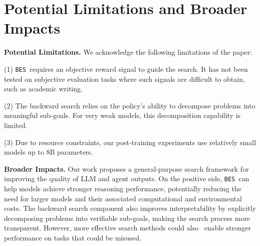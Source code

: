\documentclass{llmxive}
\providecommand{\ours}{\texttt{BES}}
\begin{document}
\section{Potential Limitations and Broader Impacts}

\label{app:lim}

\textbf{Potential Limitations.} We acknowledge the following limitations of the paper:

(1) \ours\ requires an objective reward signal to guide the search. It has not been tested on subjective evaluation tasks where such signals are difficult to obtain, such as academic writing.

(2) The backward search relies on the policy's ability to decompose problems into meaningful sub-goals. For very weak models, this decomposition capability is limited. 

(3) Due to resource constraints, our post-training experiments use relatively small models up to 8B parameters.

 

\textbf{Broader Impacts.} Our work proposes a general-purpose search framework for improving the quality of LLM and agent outputs. On the positive side, \ours\ can help models achieve stronger reasoning performance, potentially reducing the need for larger models and their associated computational and environmental costs. The backward search component also improves interpretability by explicitly decomposing problems into verifiable sub-goals, making the search process more transparent. However, more effective search methods could also  enable stronger performance on tasks that could be misused. 


% 
\end{document}
